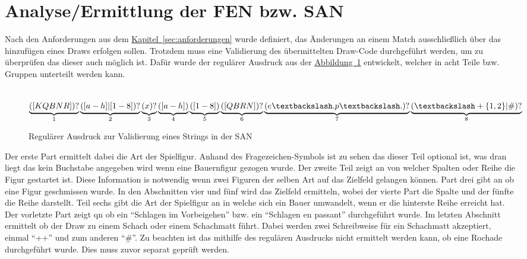 \section{Analyse/Ermittlung der FEN bzw. SAN}
Nach den Anforderungen aus dem \hyperref[sec:anforderungen]{Kapitel~\ref{sec:anforderungen}} wurde definiert, das Änderungen an einem Match ausschließlich über das hinzufügen eines Draws erfolgen sollen. Trotzdem muss eine Validierung des übermittelten Draw-Code durchgeführt werden, um zu überprüfen das dieser auch möglich ist. Dafür wurde der regulärer Ausdruck aus der \hyperref[fig:regexSAN]{Abbildung~\ref{fig:regexSAN}} entwickelt, welcher in acht Teile bzw. Gruppen unterteilt werden kann.\\
\\
\begin{figure}
	$\underbrace{([KQBNR])?}_{1}\underbrace{([a-h]|[1-8])?}_{2}\underbrace{(x)?}_{3}\underbrace{([a-h])}_{4}\underbrace{([1-8])}_{5}\underbrace{([QBRN])?}_{6}\underbrace{(e\textbackslash.p\textbackslash.)?}_{7}\underbrace{(\textbackslash+\{1,2\}|\#)?}_{8}$
\caption{Regulärer Ausdruck zur Validierung eines Strings in der SAN}
\label{fig:regexSAN}
\end{figure}
Der erste Part ermittelt dabei die Art der Spielfigur. Anhand des Fragezeichen-Symbols ist zu sehen  das dieser Teil optional ist, was dran liegt das kein Buchstabe angegeben wird wenn eine Bauernfigur gezogen wurde. Der zweite Teil zeigt an von welcher Spalten oder Reihe die Figur gestartet ist. Diese Information is notwendig wenn zwei Figuren der selben Art auf das Zielfeld gelangen können. Part drei gibt an ob eine Figur geschmissen wurde. In den Abschnitten vier und fünf wird das Zielfeld ermitteln, wobei der vierte Part die Spalte und der fünfte die Reihe darstellt. Teil sechs gibt die Art der Spielfigur an in welche sich ein Bauer umwandelt, wenn er die hinterste Reihe erreicht hat. Der vorletzte Part zeigt qn ob ein \enquote{Schlagen im Vorbeigehen} bzw. ein \enquote{Schlagen en passant} durchgeführt wurde. Im letzten Abschnitt ermittelt ob der Draw zu einem Schach oder einem Schachmatt führt. Dabei werden zwei Schreibweise für ein Schachmatt akzeptiert, einmal \enquote{++} und zum anderen \enquote{\#}. Zu beachten ist das mithilfe des regulären Ausdrucks nicht ermittelt werden kann, ob eine Rochade durchgeführt wurde. Dies muss zuvor separat geprüft werden.\\
\\
